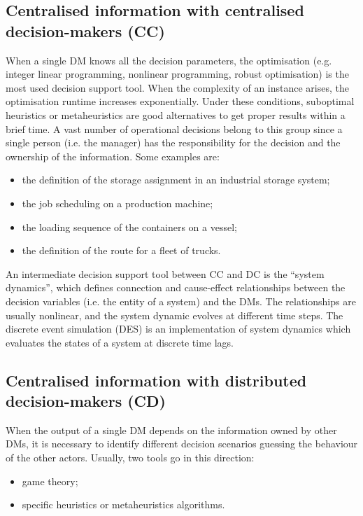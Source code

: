\subsection{Centralised information with centralised decision-makers (CC)}
When a single DM knows all the decision parameters, the optimisation (e.g. integer linear programming, nonlinear programming, robust optimisation) is the most used decision support tool. When the complexity of an instance arises, the optimisation runtime increases exponentially. Under these conditions, suboptimal heuristics or metaheuristics are good alternatives to get proper results within a brief time. A vast number of operational decisions belong to this group since a single person (i.e. the manager) has the responsibility for the decision and the ownership of the information. Some examples are:

\begin{itemize}
    \item the definition of the storage assignment in an industrial storage system;
    \item the job scheduling on a production machine;
    \item the loading sequence of the containers on a vessel;
    \item the definition of the route for a fleet of trucks.

\end{itemize}

An intermediate decision support tool between CC and DC is the “system dynamics”, which defines connection and cause-effect relationships between the decision variables (i.e. the entity of a system) and the DMs. The relationships are usually nonlinear, and the system dynamic evolves at different time steps. The discrete event simulation (DES) is an implementation of system dynamics which evaluates the states of a system at discrete time lags.

\subsection{Centralised information with distributed decision-makers (CD)}
When the output of a single DM depends on the information owned by other DMs, it is necessary to identify different decision scenarios guessing the behaviour of the other actors. Usually, two tools go in this direction:

\begin{itemize}
    \item game theory;
    \item specific heuristics or metaheuristics algorithms.
\end{itemize}

